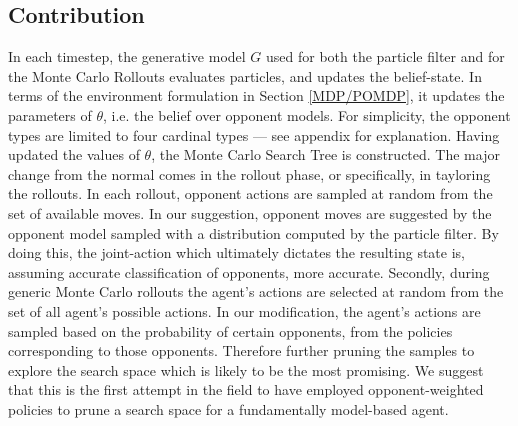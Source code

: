\subsection{Contribution}
In each timestep, the generative model $G$ used for both the particle filter and for the Monte Carlo Rollouts evaluates particles, and updates the belief-state. In terms of the environment formulation in Section \ref{MDP/POMDP}, it updates the parameters of $\theta$, i.e. the belief over opponent models. For simplicity, the opponent types are limited to four cardinal types --- see appendix for explanation. 
\newline \newline
Having updated the values of $\theta$, the Monte Carlo Search Tree is constructed. The major change from the normal comes in the rollout phase, or specifically, in tayloring the rollouts.
\newline\newline
In each rollout, opponent actions are sampled at random from the set of available moves. In our suggestion, opponent moves are suggested by the opponent model sampled with a distribution computed by the particle filter. By doing this, the joint-action which ultimately dictates the resulting state is, assuming accurate classification of opponents, more accurate. 
\newline \newline
Secondly, during generic Monte Carlo rollouts the agent's actions are selected at random from the set of all agent's possible actions. In our modification, the agent's actions are sampled based on the probability of certain opponents, from the policies corresponding to those opponents. Therefore further pruning the samples to explore the search space which is likely to be the most promising. 
\newline\newline
We suggest that this is the first attempt in the field to have employed opponent-weighted policies to prune a search space for a fundamentally model-based agent. 
